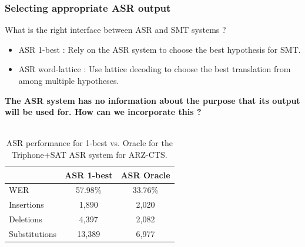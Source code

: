 \documentclass{beamer}
\begin{document}
\begin{frame}
\frametitle{Selecting appropriate ASR output}
What is the right interface between ASR and SMT systems ?
\begin{itemize}
\item ASR 1-best : Rely on the ASR system to choose the best hypothesis for SMT.
\item ASR word-lattice : Use lattice decoding to choose the best translation from among multiple hypotheses.
\end{itemize}

\textbf{The ASR system has no information about the purpose that its output will be used for. How can we incorporate this ?}\\~\\

\begin{table}
\begin{center}
\begin{tabular}{| l | c | c |}
  \hline 
  \textbf{} & \textbf{ASR 1-best} & \textbf{ASR Oracle}\\ \hline
  WER & 57.98\% & 33.76\%\\
  \hline
  Insertions & 1,890 & 2,020\\
  \hline
  Deletions & 4,397 & 2,082\\
  \hline
  Substitutions & 13,389 & 6,977\\ 
  \hline
\end{tabular}
\caption{ASR performance for 1-best vs. Oracle for the Triphone+SAT ASR system for ARZ-CTS.}
\end{center}
\end{table}
\end{frame}
\end{document}
